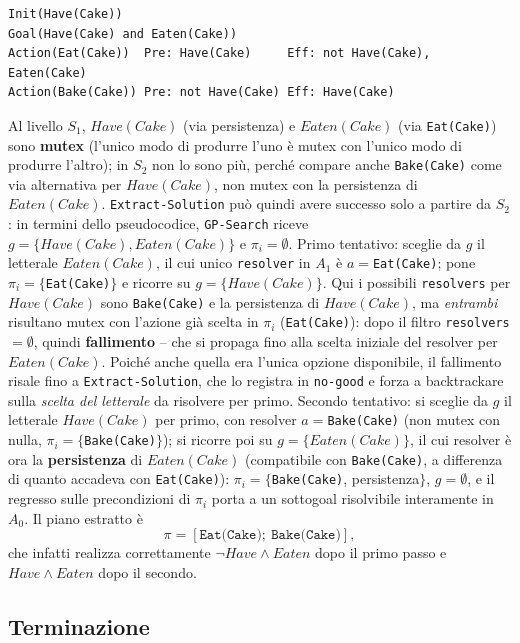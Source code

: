 \documentclass[a4paper,11pt]{article}
\begin{document}
\begin{lstlisting}
Init(Have(Cake))
Goal(Have(Cake) and Eaten(Cake))
Action(Eat(Cake))  Pre: Have(Cake)     Eff: not Have(Cake), Eaten(Cake)
Action(Bake(Cake)) Pre: not Have(Cake) Eff: Have(Cake)
\end{lstlisting}
Al livello $S_1$, $Have(Cake)$ (via persistenza) e $Eaten(Cake)$ (via \texttt{Eat(Cake)}) sono \textbf{mutex} (l'unico modo di produrre l'uno è mutex con l'unico modo di produrre l'altro); in $S_2$ non lo sono più, perché compare anche \texttt{Bake(Cake)} come via alternativa per $Have(Cake)$, non mutex con la persistenza di $Eaten(Cake)$. \texttt{Extract-Solution} può quindi avere successo solo a partire da $S_2$: in termini dello pseudocodice, \texttt{GP-Search} riceve $g=\{Have(Cake),Eaten(Cake)\}$ e $\pi_i=\emptyset$. Primo tentativo: sceglie da $g$ il letterale $Eaten(Cake)$, il cui unico \texttt{resolver} in $A_1$ è $a=$\texttt{Eat(Cake)}; pone $\pi_i=\{$\texttt{Eat(Cake)}$\}$ e ricorre su $g=\{Have(Cake)\}$. Qui i possibili \texttt{resolvers} per $Have(Cake)$ sono \texttt{Bake(Cake)} e la persistenza di $Have(Cake)$, ma \emph{entrambi} risultano mutex con l'azione già scelta in $\pi_i$ (\texttt{Eat(Cake)}): dopo il filtro \texttt{resolvers}$=\emptyset$, quindi \textbf{fallimento} -- che si propaga fino alla scelta iniziale del resolver per $Eaten(Cake)$. Poiché anche quella era l'unica opzione disponibile, il fallimento risale fino a \texttt{Extract-Solution}, che lo registra in \texttt{no-good} e forza a backtrackare sulla \emph{scelta del letterale} da risolvere per primo. Secondo tentativo: si sceglie da $g$ il letterale $Have(Cake)$ per primo, con resolver $a=$\texttt{Bake(Cake)} (non mutex con nulla, $\pi_i=\{$\texttt{Bake(Cake)}$\}$); si ricorre poi su $g=\{Eaten(Cake)\}$, il cui resolver è ora la \textbf{persistenza} di $Eaten(Cake)$ (compatibile con \texttt{Bake(Cake)}, a differenza di quanto accadeva con \texttt{Eat(Cake)}): $\pi_i=\{$\texttt{Bake(Cake)}, persistenza$\}$, $g=\emptyset$, e il regresso sulle precondizioni di $\pi_i$ porta a un sottogoal risolvibile interamente in $A_0$. Il piano estratto è
\[
\pi = [\texttt{Eat(Cake)};\ \texttt{Bake(Cake)}],
\]
che infatti realizza correttamente $\neg Have\wedge Eaten$ dopo il primo passo e $Have\wedge Eaten$ dopo il secondo.

\subsection{Terminazione}
\end{document}
